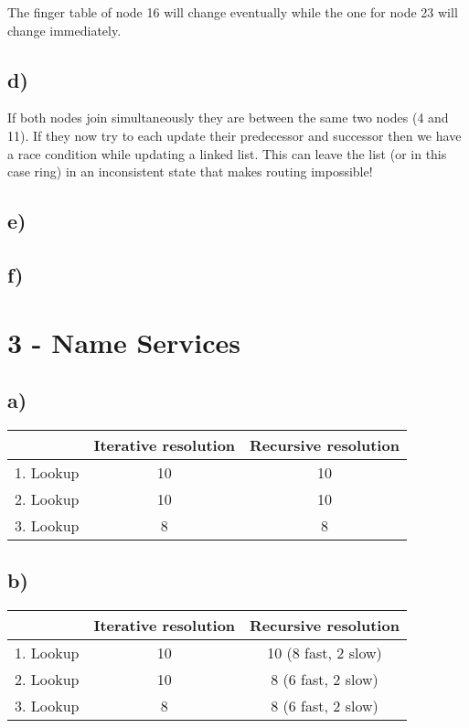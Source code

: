 \documentclass{scrartcl}
\begin{document}
The finger table of node 16 will change eventually while the one for node 23 will change immediately.


\subsection*{d)}
If both nodes join simultaneously they are between the same two nodes (4 and 11). If they now try to each update their predecessor and successor then we have a race condition while updating a linked list. This can leave the list (or in this case ring) in an inconsistent state that makes routing impossible!


\subsection*{e)}
\subsection*{f)}



\section*{3 - Name Services}


\subsection*{a)}
\begin{center}
	\begin{tabular}{|c|c|c|}
		\hline
		& Iterative resolution & Recursive resolution \\ \hline
		1. Lookup & 10 & 10 \\ \hline
		2. Lookup & 10 & 10 \\ \hline
		3. Lookup & 8 & 8 \\ \hline
	\end{tabular}
\end{center}


\subsection*{b)}
\begin{center}
	\begin{tabular}{|c|c|c|}
		\hline
		& Iterative resolution & Recursive resolution \\ \hline
		1. Lookup & 10 & 10 (8 fast, 2 slow) \\ \hline
		2. Lookup & 10 & 8 (6 fast, 2 slow) \\ \hline
		3. Lookup & 8 & 8 (6 fast, 2 slow) \\ \hline
	\end{tabular}
\end{center}
\end{document}
